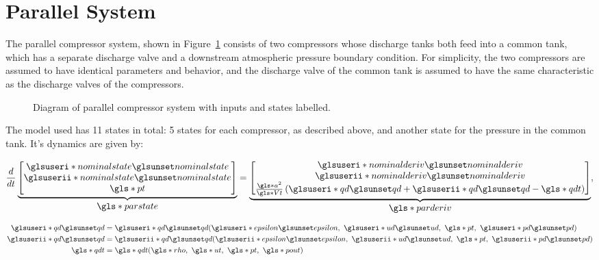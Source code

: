 \section{Parallel System}
\label{sec:mod:parallel}

The parallel compressor system, shown in Figure~\ref{fig:mod:parallel} consists of two compressors whose discharge tanks both feed into a common tank, which has a separate discharge valve and a downstream atmospheric pressure boundary condition.
For simplicity, the two compressors are assumed to have identical parameters and behavior, and the discharge valve of the common tank is assumed to have the same characteristic as the discharge valves of the compressors.

\begin{figure}
  \centering
  
  \caption{Diagram of parallel compressor system with inputs and states labelled.}
  \label{fig:mod:parallel}
\end{figure}



The model used has 11 states in total: 5 states for each compressor, as described above, and another state for the pressure in the common tank. It's dynamics are given by:

\begin{equation}
  \dt{}
  \ubrace{\begin{bmatrix}
    \gi{nominalstate}\\
    \gii{nominalstate}\\
    \g{pt} 
  \end{bmatrix}}{\g{parstate}}
  =
  \ubrace{\begin{bmatrix}
    \gi{nominalderiv}\\
    \gii{nominalderiv}\\
    \frac{\g{a}^2}{\g{Vt}}\left(\gi{qd}+\gii{qd}-\g{qdt}\right)
  \end{bmatrix}}{\g{parderiv}},
\end{equation}

\begin{equation}
  \begin{split}
    \gi{qd} & = \gi{qd}(\gi{epsilon},\ \gi{ud},\ \g{pt},\ \gi{pd})\\
    \gii{qd} & = \gii{qd}(\gii{epsilon},\ \gii{ud},\ \g{pt},\ \gii{pd})\\
    \g{qdt} & = \g{qdt}(\g{rho},\ \g{ut},\ \g{pt},\ \g{pout})
  \end{split}
\end{equation}

